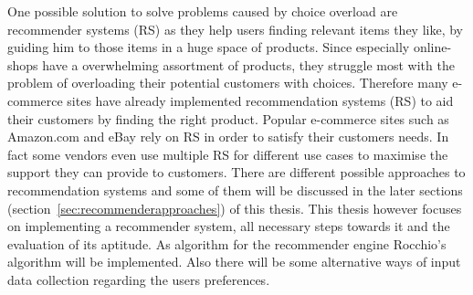 One possible solution to solve problems caused by choice overload are recommender systems (RS) as they help users finding relevant items they like, by guiding him to those items in a huge space of products.\citep[p.~63]{bollen:2010}
Since especially online-shops have a overwhelming assortment of products, they struggle most with the problem of overloading their potential customers with choices.
Therefore many \gls{e-commerce} sites have already implemented recommendation systems (RS) to aid their customers by finding the right product.
Popular e-commerce sites such as Amazon.com and \gls{eBay} rely on RS in order to satisfy their customers needs.
In fact some vendors even use multiple RS for different use cases to maximise the support they can provide to customers.
\citep[p.~158]{schafer:1999}
There are different possible approaches to recommendation systems and some of them will be discussed in the later sections (section~\ref{sec:recommenderapproaches}) of this thesis.
This thesis however focuses on implementing a recommender system, all necessary steps towards it and the evaluation of its aptitude.
As algorithm for the recommender engine Rocchio's algorithm will be implemented.
Also there will be some alternative ways of input data collection regarding the users preferences.


